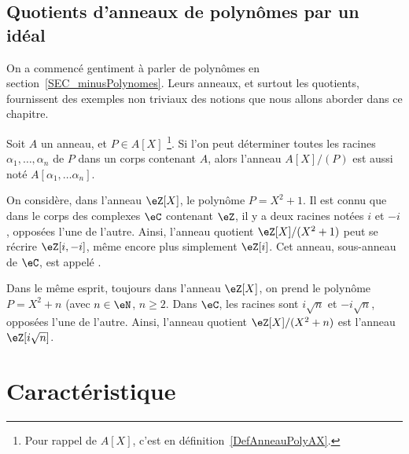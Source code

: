 \subsection{Quotients d'anneaux de polynômes par un idéal}
  On a commencé gentiment à parler de polynômes en section~\ref{SEC_minusPolynomes}. Leurs anneaux, et surtout les quotients, fournissent des exemples non triviaux des notions que nous allons aborder dans ce chapitre.

\begin{definition}\label{DEF_ExtensionAnneau}
  Soit \( A \) un anneau, et \( P \in A[X] \) \footnote{Pour rappel de \(A[X] \), c'est en définition~\ref{DefAnneauPolyAX}.}. Si l'on peut déterminer toutes les racines \( \alpha_1, \dots, \alpha_n \) de \( P \) dans un corps contenant \( A \), alors l'anneau \( A[X] / (P) \) est aussi noté \(A[\alpha_1,\dots \alpha_n]\).
\end{definition}

\begin{example}  \label{EX_ConstructionEntiersGauss}
  On considère, dans l'anneau \( \eZ[X] \), le polynôme \( P = X^2 + 1 \). Il est connu que dans le corps des complexes \( \eC \) contenant \( \eZ \), il y a deux racines notées \( i \) et \(-i \), opposées l'une de l'autre. Ainsi, l'anneau quotient \( \eZ[X]/(X^2 + 1) \) peut se récrire \( \eZ[i, -i] \), même encore plus simplement \( \eZ[i] \). Cet anneau, sous-anneau de \( \eC \), est appelé .
\end{example}

\begin{example}  \label{EX_ConstructionZisqrtn}
  Dans le même esprit, toujours dans l'anneau \( \eZ[X] \), on prend le polynôme \( P = X^2 + n \) (avec \( n \in \eN \), \( n \geq 2\). Dans \( \eC \), les racines sont \( i\sqrt n \) et \(-i \sqrt n\), opposées l'une de l'autre. Ainsi, l'anneau quotient \( \eZ[X]/(X^2 + n) \) est l'anneau \( \eZ[i \sqrt n] \).
\end{example}

\section{Caractéristique}

